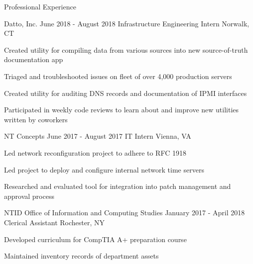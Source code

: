 \documentclass[8pt]{resume} %
\begin{document}

\begin{rSection}{Professional Experience}

    \begin{rSubsection}
        {Datto, Inc.}
        {June 2018 - August 2018}
        {Infrastructure Engineering Intern}
        {Norwalk, CT}
    \item Created utility for compiling data from various sources into new
        source-of-truth documentation app
    \item Triaged and troubleshooted issues on fleet of over 4,000 production
        servers
    \item Created utility for auditing DNS records and documentation of IPMI
        interfaces
    \item Participated in weekly code reviews to learn about and improve new
        utilities written by coworkers
    \end{rSubsection}


    \begin{rSubsection}
        {NT Concepts}
        {June 2017 - August 2017}
        {IT Intern}
        {Vienna, VA}
    \item Led network reconfiguration project to adhere to RFC 1918
    \item Led project to deploy and configure internal network time servers
    \item Researched and evaluated tool for integration into patch management
        and approval process
    \end{rSubsection}


    \begin{rSubsection}
        {NTID Office of Information and Computing Studies}
        {January 2017 - April 2018}
        {Clerical Assistant}
        {Rochester, NY}
    \item Developed curriculum for CompTIA A+ preparation course
    \item Maintained inventory records of department assets
    \end{rSubsection}

\end{rSection}





\end{document}
